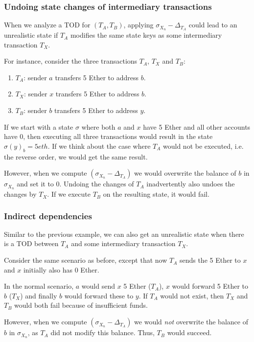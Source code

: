 \documentclass[draft,final]{vutinfth} %
\begin{document}
\subsubsection{Undoing state changes of intermediary transactions}

When we analyze a TOD for $(T_A, T_B)$, applying $\sigma_{X_n} - \Delta_{T_A}$ could lead to an unrealistic state if $T_A$ modifies the same state keys as some intermediary transaction $T_X$.

For instance, consider the three transactions $T_A$, $T_X$ and $T_B$:

\begin{enumerate}
    \item $T_A$: sender $a$ transfers 5 Ether to address $b$.
    \item $T_X$: sender $x$ transfers 5 Ether to address $b$.
    \item $T_B$: sender $b$ transfers 5 Ether to address $y$.
\end{enumerate}

If we start with a state $\sigma$ where both $a$ and $x$ have 5 Ether and all other accounts have 0, then executing all three transactions would result in the state $\sigma(y)_b = 5 eth$. If we think about the case where $T_A$ would not be executed, i.e. the reverse order, we would get the same result.

However, when we compute $(\sigma_{X_n} - \Delta_{T_A})$ we would overwrite the balance of $b$ in $\sigma_{X_n}$ and set it to 0. Undoing the changes of $T_A$ inadvertently also undoes the changes by $T_X$. If we execute $T_B$ on the resulting state, it would fail.

\subsubsection{Indirect dependencies}

Similar to the previous example, we can also get an unrealistic state when there is a TOD between $T_A$ and some intermediary transaction $T_X$.

Consider the same scenario as before, except that now $T_A$ sends the 5 Ether to $x$ and $x$ initially also has 0 Ether.

In the normal scenario, $a$ would send $x$ 5 Ether ($T_A$), $x$ would forward 5 Ether to $b$ ($T_X$) and finally $b$ would forward these to $y$. If $T_A$ would not exist, then $T_X$ and $T_B$ would both fail because of insufficient funds.

However, when we compute $(\sigma_{X_n} - \Delta_{T_A})$ we would \emph{not} overwrite the balance of $b$ in $\sigma_{X_n}$, as $T_A$ did not modify this balance. Thus, $T_B$ would succeed.
\end{document}
